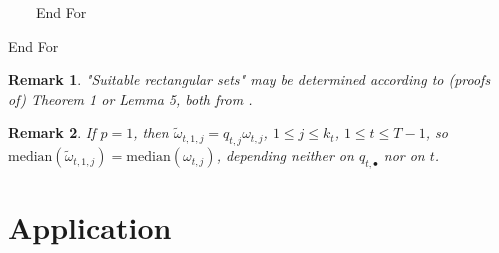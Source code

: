 \documentclass{article}              %
\newtheorem{remark}{Remark}
\begin{document}
$\qquad$End For

End For

\bigskip

\begin{remark} \label{rem:suitable} "Suitable rectangular sets" may be determined according to (proofs of) Theorem 1 or Lemma 5, both from \cite{Smid09c}.
\end{remark}


\begin{remark} \label{rem:eforward} If $p=1$, then
$
\tilde{\omega}_{t,1,j}=q_{t,j}\omega_{t,j}
$, $1\leq j\leq k_{t}$, $1\leq t\leq T-1$, so $\mathrm{median}(\tilde{\omega}_{t,1,j})=\mathrm{median}(\omega_{t,j})$, depending neither on $q_{t,\bullet}$ nor on $t$. 
\end{remark}

\section{\label{sec:appl}Application}
\end{document}
